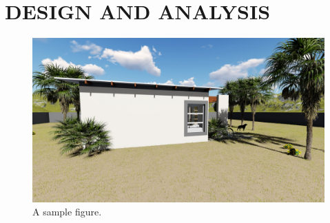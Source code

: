 
\chapter{DESIGN AND ANALYSIS}

\begin{figure}
	\includegraphics[scale=0.2]{./images/REAR.jpg}
	\caption{A sample figure.}
\end{figure}

